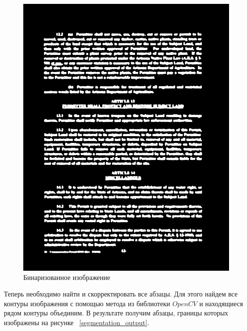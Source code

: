 \begin{figure}
    \includegraphics[scale=0.2]{img/paragraph/thresh.png}
    \caption{Бинаризованное изображение}
    \label{segmentation_threshold}
\end{figure}

Теперь необходимо найти и скорректировать все абзацы. Для этого найдем все контуры изображения с помощью метода из библиотеки $OpenCV$ \cite{opencv_contours} и находящиеся рядом контуры объединим.
В результате получим абзацы, границы которых изображены на рисунке ~\ref{segmentation_output}.

